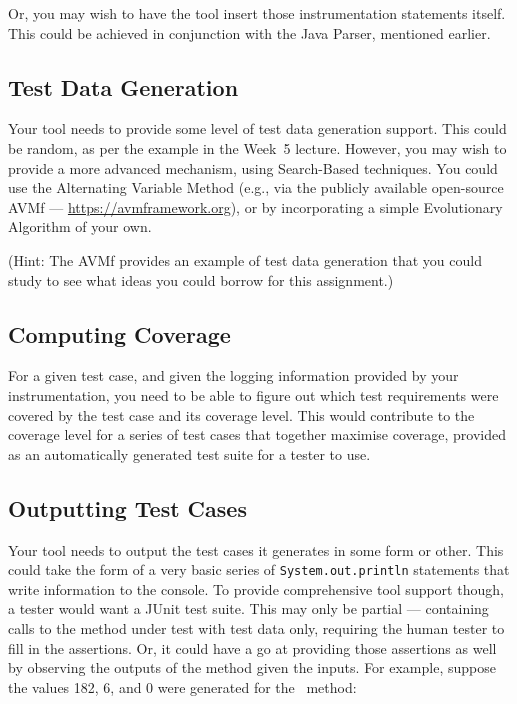 Or,
you may wish to have the tool insert those instrumentation statements itself.
This could be achieved in conjunction with the Java Parser, mentioned earlier.


\subsection{Test Data Generation}

Your tool needs to provide some level of test data generation support. This
could be random, as per the example in the Week~5 lecture. However, you may wish
to provide a more advanced mechanism, using Search-Based techniques. You could
use the Alternating Variable Method (e.g., via the publicly available
open-source AVMf --- \url{https://avmframework.org}), or by incorporating a simple
Evolutionary Algorithm of your own.

(Hint: The AVMf provides an example of test data generation that you could study
to see what ideas you could borrow for this assignment.)


\subsection{Computing Coverage}

For a given test case, and given the logging information provided by your
instrumentation, you need to be able to figure out which test requirements were
covered by the test case and its coverage level. This would contribute to the
coverage level for a series of test cases that together maximise coverage,
provided as an automatically generated test suite for a tester to use.


\subsection{Outputting Test Cases}

Your tool needs to output the test cases it generates in some form or other.
This could take the form of a very basic series of {\tt System.out.println}
statements that write information to the console. To provide comprehensive tool
support though, a tester would want a JUnit test suite. This may only be partial
--- containing calls to the method under test with test data only, requiring the
human tester to fill in the assertions. Or, it could have a go at providing
those assertions as well by observing the outputs of the method given the
inputs. For example, suppose the values 182, 6, and 0 were generated for the
\calculatemethod~method:

